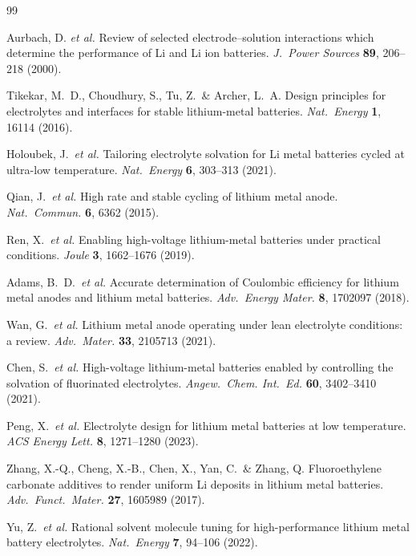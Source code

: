 \documentclass[11pt]{article}
\theoremstyle{plain}
\theoremstyle{definition}
\theoremstyle{remark}
\begin{document}
\begin{thebibliography}{99}

Aurbach, D. \textit{et al.}
Review of selected electrode--solution interactions which determine the
performance of Li and Li ion batteries.
\textit{J.\ Power Sources} \textbf{89}, 206--218 (2000).

Tikekar, M.\ D., Choudhury, S., Tu, Z.\ \& Archer, L.\ A.
Design principles for electrolytes and interfaces for stable lithium-metal
batteries.
\textit{Nat.\ Energy} \textbf{1}, 16114 (2016).

Holoubek, J.\ \textit{et al.}
Tailoring electrolyte solvation for Li metal batteries
cycled at ultra-low temperature.
\textit{Nat.\ Energy} \textbf{6}, 303--313 (2021).

Qian, J.\ \textit{et al.}
High rate and stable cycling of lithium metal anode.
\textit{Nat.\ Commun.} \textbf{6}, 6362 (2015).

Ren, X.\ \textit{et al.}
Enabling high-voltage lithium-metal batteries under practical conditions.
\textit{Joule} \textbf{3}, 1662--1676 (2019).

Adams, B.\ D.\ \textit{et al.}
Accurate determination of Coulombic efficiency for lithium metal anodes
and lithium metal batteries.
\textit{Adv.\ Energy Mater.} \textbf{8}, 1702097 (2018).

Wan, G.\ \textit{et al.}
Lithium metal anode operating under lean electrolyte conditions:
a review.
\textit{Adv.\ Mater.} \textbf{33}, 2105713 (2021).

Chen, S.\ \textit{et al.}
High-voltage lithium-metal batteries enabled by controlling the solvation
of fluorinated electrolytes.
\textit{Angew.\ Chem. Int.\ Ed.} \textbf{60}, 3402--3410 (2021).

Peng, X.\ \textit{et al.}
Electrolyte design for lithium metal batteries at low temperature.
\textit{ACS Energy Lett.} \textbf{8}, 1271--1280 (2023).

Zhang, X.-Q., Cheng, X.-B., Chen, X., Yan, C.\ \& Zhang, Q.
Fluoroethylene carbonate additives to render uniform Li deposits in
lithium metal batteries.
\textit{Adv.\ Funct.\ Mater.} \textbf{27}, 1605989 (2017).

Yu, Z.\ \textit{et al.}
Rational solvent molecule tuning for high-performance lithium metal battery
electrolytes.
\textit{Nat.\ Energy} \textbf{7}, 94--106 (2022).


\end{thebibliography}
\end{document}
